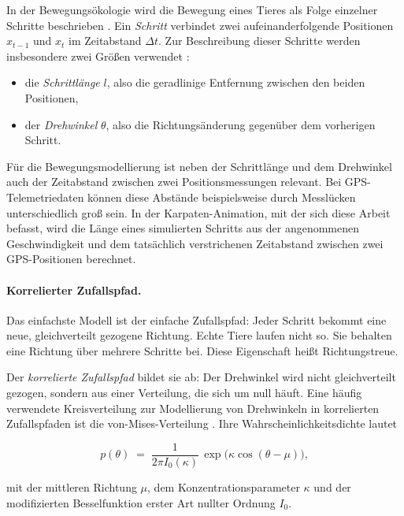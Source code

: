\documentclass[12pt,a4paper]{report}
\begin{document}
In der Bewegungsökologie wird die Bewegung eines Tieres als Folge einzelner Schritte
beschrieben \cite{Thurfjell2014}. Ein \emph{Schritt} verbindet zwei aufeinanderfolgende
Positionen $x_{t-1}$ und $x_t$ im Zeitabstand
$\Delta t$. Zur Beschreibung dieser Schritte
werden insbesondere zwei Größen verwendet
\cite{Thurfjell2014}:

\begin{itemize}
    \item die \emph{Schrittlänge} $l$, also die
    geradlinige Entfernung zwischen den beiden
    Positionen,
    \item der \emph{Drehwinkel} $\theta$, also die
    Richtungsänderung gegenüber dem vorherigen Schritt.
\end{itemize}


Für die Bewegungsmodellierung ist neben der
Schrittlänge und dem Drehwinkel auch der
Zeitabstand zwischen zwei Positionsmessungen
relevant. Bei GPS-Telemetriedaten können diese
Abstände beispielsweise durch Messlücken
unterschiedlich groß sein. In der Karpaten-Animation, mit der sich diese Arbeit befasst, wird die Länge eines simulierten Schritts aus der angenommenen Geschwindigkeit und dem
tatsächlich verstrichenen Zeitabstand zwischen zwei GPS-Positionen berechnet.



\paragraph{Korrelierter Zufallspfad.}

Das einfachste Modell ist der einfache Zufallspfad: Jeder Schritt bekommt eine neue,
gleichverteilt gezogene Richtung. Echte Tiere laufen nicht so. Sie behalten eine Richtung
über mehrere Schritte bei. Diese Eigenschaft heißt Richtungstreue.

Der \emph{korrelierte Zufallspfad} bildet sie ab: Der Drehwinkel wird nicht
gleichverteilt gezogen, sondern aus einer Verteilung, die sich um null häuft. Eine häufig verwendete Kreisverteilung zur Modellierung
von Drehwinkeln in korrelierten Zufallspfaden ist die von-Mises-Verteilung \cite[S.~818, Box~1]{Codling2008}.
Ihre Wahrscheinlichkeitsdichte lautet

\begin{equation}
    p(\theta) \;=\; \frac{1}{2\pi I_{0}(\kappa)}\,
    \exp\!\bigl(\kappa \cos(\theta - \mu)\bigr),
    \label{eq:vonmises}
\end{equation}

mit der mittleren Richtung $\mu$, dem Konzentrationsparameter $\kappa$ und der
modifizierten Besselfunktion erster Art nullter Ordnung $I_{0}$.
\end{document}
